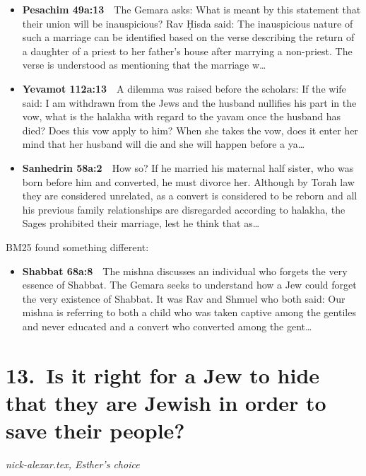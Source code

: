 \documentclass[11pt,a4paper]{article}
\begin{document}
\begin{itemize}[leftmargin=1.2em,itemsep=3pt]
\item {\color{ref}\textbf{Pesachim 49a:13}}\ \ The Gemara asks: What is meant by this statement that their union will be inauspicious? Rav Ḥisda said: The inauspicious nature of such a marriage can be identified based on the verse describing the return of a daughter of a priest to her father’s house after marrying a non-priest. The verse is understood as mentioning that the marriage w\ldots
\item {\color{ref}\textbf{Yevamot 112a:13}}\ \ A dilemma was raised before the scholars: If the wife said: I am withdrawn from the Jews and the husband nullifies his part in the vow, what is the halakha with regard to the yavam once the husband has died? Does this vow apply to him? When she takes the vow, does it enter her mind that her husband will die and she will happen before a ya\ldots
\item {\color{ref}\textbf{Sanhedrin 58a:2}}\ \ How so? If he married his maternal half sister, who was born before him and converted, he must divorce her. Although by Torah law they are considered unrelated, as a convert is considered to be reborn and all his previous family relationships are disregarded according to halakha, the Sages prohibited their marriage, lest he think that as\ldots
\end{itemize}
{\color{quiet}\small BM25 found something different:}
\begin{itemize}[leftmargin=1.2em]
\item {\color{ref}\textbf{Shabbat 68a:8}}\ \ The mishna discusses an individual who forgets the very essence of Shabbat. The Gemara seeks to understand how a Jew could forget the very existence of Shabbat. It was Rav and Shmuel who both said: Our mishna is referring to both a child who was taken captive among the gentiles and never educated and a convert who converted among the gent\ldots
\end{itemize}

\section*{13.\ Is it right for a Jew to hide that they are Jewish in order to save their people?}
{\color{quiet}\small\textit{nick-alexar.tex, Esther's choice}}
\end{document}
